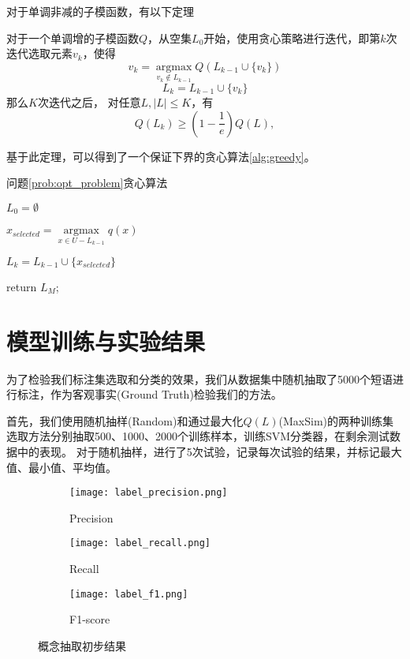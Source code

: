 对于单调非减的子模函数，有以下定理
\begin{theorem}
对于一个单调增的子模函数$Q$，从空集$L_0$开始，使用贪心策略进行迭代，即第$k$次迭代选取元素$v_k$，使得
\[
	v_k = \mathop {\arg \max }\limits_{v_k \notin L_{k-1} } Q(L_{k-1}\cup \{v_k\}) 
\]
\[
	L_k = L_{k-1} \cup \{ v_k \} 
\]
那么$K$次迭代之后， 对任意$L, |L| \le K$，有
\[
	Q(L_k) \ge (1-\frac{1}{e}) Q(L),
\]
\end{theorem}

基于此定理，可以得到了一个保证下界的贪心算法\ref{alg:greedy}。
\begin{algorithm}
  \caption{问题\ref{prob:opt_problem}贪心算法}
  $L_0 = \emptyset$\;
  {

  	$x_{selected} = \mathop {\arg \max }\limits_{x \in U - {L_{k - 1}}} q(x)$

  	$L_k = L_{k-1}\cup\{x_{selected}\}$ 
  }
  return $L_M$;
  \label{alg:greedy}
\end{algorithm}

\section{模型训练与实验结果}
为了检验我们标注集选取和分类的效果，我们从数据集中随机抽取了5000个短语进行标注，作为客观事实(Ground Truth)检验我们的方法。

首先，我们使用随机抽样(Random)和通过最大化$Q(L)$(MaxSim)的两种训练集选取方法分别抽取500、1000、2000个训练样本，训练SVM分类器，在剩余测试数据中的表现。
对于随机抽样，进行了5次试验，记录每次试验的结果，并标记最大值、最小值、平均值。

\begin{figure}[h!]
  \centering
  \begin{subfigure}{0.3\textwidth}
    \texttt{[image: label\_precision.png]}
    \caption{Precision}
  \end{subfigure} 
  \begin{subfigure}{0.3\textwidth}
    \texttt{[image: label\_recall.png]}
    \caption{Recall}
  \end{subfigure}
  \begin{subfigure}{0.3\textwidth}
  	\texttt{[image: label\_f1.png]}
  	\caption{F1-score}
  \end{subfigure}
  \caption{概念抽取初步结果}
  \label{fig:testing_vs_random}
\end{figure}

